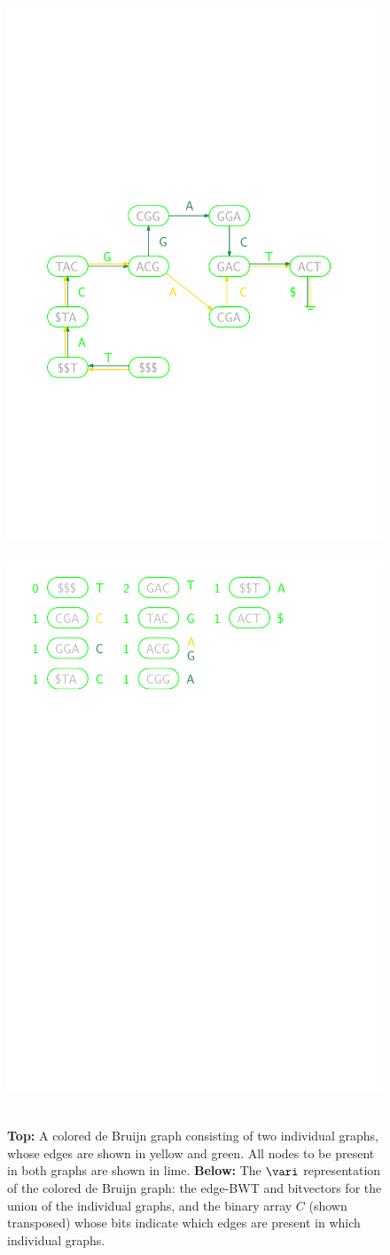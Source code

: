 \begin{figure}
\centering
\includegraphics[width=.35\textwidth]{limegraph.pdf} \\~\\
\includegraphics[width=.35\textwidth]{limeonlymapping.pdf} \\~\\
\caption{{\bf Top:} A colored de Bruijn graph consisting of two individual graphs, whose edges are shown in yellow and green. All nodes to be present in both graphs are shown in lime.  {\bf Below:} The $\vari$ representation of the colored de Bruijn graph: the edge-BWT and bitvectors for the union of the individual graphs, and the binary array $C$ (shown transposed) whose bits indicate which edges are present in which individual graphs.}
\label{fig:purple}
\end{figure}
